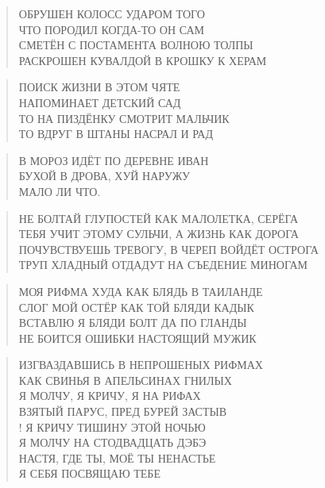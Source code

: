 \poemtitle{***}
\begin{verse}
ОБРУШЕН КОЛОСС УДАРОМ ТОГО\\
ЧТО ПОРОДИЛ КОГДА-ТО ОН САМ\\
СМЕТЁН С ПОСТАМЕНТА ВОЛНОЮ ТОЛПЫ\\
РАСКРОШЕН КУВАЛДОЙ В КРОШКУ К ХЕРАМ
\end{verse}

\poemtitle{***}
\begin{verse}
ПОИСК ЖИЗНИ В ЭТОМ ЧЯТЕ\\
НАПОМИНАЕТ ДЕТСКИЙ САД\\
ТО НА ПИЗДЁНКУ СМОТРИТ МАЛЬЧИК\\
ТО ВДРУГ В ШТАНЫ НАСРАЛ И РАД
\end{verse}

\poemtitle{***}
\begin{verse}
В МОРОЗ ИДЁТ ПО ДЕРЕВНЕ ИВАН\\
БУХОЙ В ДРОВА, ХУЙ НАРУЖУ\\
МАЛО ЛИ ЧТО.
\end{verse}

\poemtitle{***}
\begin{verse}
НЕ БОЛТАЙ ГЛУПОСТЕЙ КАК МАЛОЛЕТКА, СЕРЁГА\\
ТЕБЯ УЧИТ ЭТОМУ СУЛЬЧИ, А ЖИЗНЬ КАК ДОРОГА\\
ПОЧУВСТВУЕШЬ ТРЕВОГУ, В ЧЕРЕП ВОЙДЁТ ОСТРОГА\\
ТРУП ХЛАДНЫЙ ОТДАДУТ НА СЪЕДЕНИЕ МИНОГАМ
\end{verse}

\poemtitle{***}
\begin{verse}
МОЯ РИФМА ХУДА КАК БЛЯДЬ В ТАИЛАНДЕ\\
СЛОГ МОЙ ОСТЁР КАК ТОЙ БЛЯДИ КАДЫК\\
ВСТАВЛЮ Я БЛЯДИ БОЛТ ДА ПО ГЛАНДЫ\\
НЕ БОИТСЯ ОШИБКИ НАСТОЯЩИЙ МУЖИК
\end{verse}

\poemtitle{***}
\begin{verse}
ИЗГВАЗДАВШИСЬ В НЕПРОШЕНЫХ РИФМАХ\\
КАК СВИНЬЯ В АПЕЛЬСИНАХ ГНИЛЫХ\\
Я МОЛЧУ, Я КРИЧУ, Я НА РИФАХ\\
ВЗЯТЫЙ ПАРУС, ПРЕД БУРЕЙ ЗАСТЫВ\\!
Я КРИЧУ ТИШИНУ ЭТОЙ НОЧЬЮ\\
Я МОЛЧУ НА СТОДВАДЦАТЬ ДЭБЭ\\
НАСТЯ, ГДЕ ТЫ, МОЁ ТЫ НЕНАСТЬЕ\\
Я СЕБЯ ПОСВЯЩАЮ ТЕБЕ
\end{verse}

